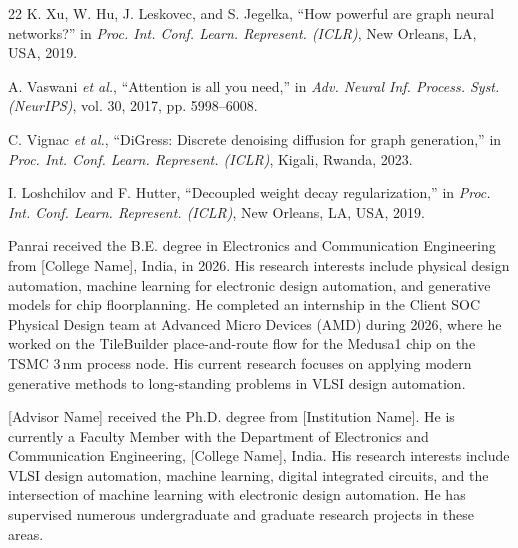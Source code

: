\documentclass[lettersize,journal]{IEEEtran}
\begin{document}
\begin{thebibliography}{22}
K. Xu, W. Hu, J. Leskovec, and S. Jegelka, ``How powerful are graph neural networks?'' in \emph{Proc. Int. Conf. Learn. Represent. (ICLR)}, New Orleans, LA, USA, 2019.

A. Vaswani \emph{et al.}, ``Attention is all you need,'' in \emph{Adv. Neural Inf. Process. Syst. (NeurIPS)}, vol. 30, 2017, pp. 5998--6008.

C. Vignac \emph{et al.}, ``DiGress: Discrete denoising diffusion for graph generation,'' in \emph{Proc. Int. Conf. Learn. Represent. (ICLR)}, Kigali, Rwanda, 2023.

I. Loshchilov and F. Hutter, ``Decoupled weight decay regularization,'' in \emph{Proc. Int. Conf. Learn. Represent. (ICLR)}, New Orleans, LA, USA, 2019.

\end{thebibliography}

\newpage

\begin{IEEEbiographynophoto}{Panrai}
received the B.E. degree in Electronics and Communication Engineering from [College Name], India, in 2026. His research interests include physical design automation, machine learning for electronic design automation, and generative models for chip floorplanning. He completed an internship in the Client SOC Physical Design team at Advanced Micro Devices (AMD) during 2026, where he worked on the TileBuilder place-and-route flow for the Medusa1 chip on the TSMC 3\,nm process node. His current research focuses on applying modern generative methods to long-standing problems in VLSI design automation.
\end{IEEEbiographynophoto}

\vspace{11pt}

\begin{IEEEbiographynophoto}{[Advisor Name]}
received the Ph.D. degree from [Institution Name]. He is currently a Faculty Member with the Department of Electronics and Communication Engineering, [College Name], India. His research interests include VLSI design automation, machine learning, digital integrated circuits, and the intersection of machine learning with electronic design automation. He has supervised numerous undergraduate and graduate research projects in these areas.
\end{IEEEbiographynophoto}

\vfill
\end{document}
